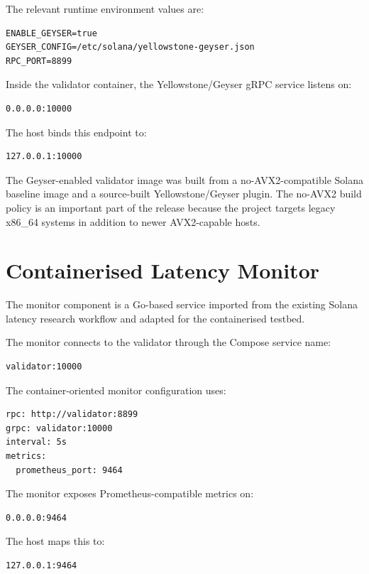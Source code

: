 \documentclass[11pt,a4paper]{article}
\begin{document}
The relevant runtime environment values are:

\begin{lstlisting}
ENABLE_GEYSER=true
GEYSER_CONFIG=/etc/solana/yellowstone-geyser.json
RPC_PORT=8899
\end{lstlisting}

Inside the validator container, the Yellowstone/Geyser gRPC service listens on:

\begin{lstlisting}
0.0.0.0:10000
\end{lstlisting}

The host binds this endpoint to:

\begin{lstlisting}
127.0.0.1:10000
\end{lstlisting}

The Geyser-enabled validator image was built from a no-AVX2-compatible Solana baseline image and a source-built Yellowstone/Geyser plugin. The no-AVX2 build policy is an important part of the release because the project targets legacy x86\_64 systems in addition to newer AVX2-capable hosts.

\section{Containerised Latency Monitor}

The monitor component is a Go-based service imported from the existing Solana latency research workflow and adapted for the containerised testbed.

The monitor connects to the validator through the Compose service name:

\begin{lstlisting}
validator:10000
\end{lstlisting}

The container-oriented monitor configuration uses:

\begin{lstlisting}
rpc: http://validator:8899
grpc: validator:10000
interval: 5s
metrics:
  prometheus_port: 9464
\end{lstlisting}

The monitor exposes Prometheus-compatible metrics on:

\begin{lstlisting}
0.0.0.0:9464
\end{lstlisting}

The host maps this to:

\begin{lstlisting}
127.0.0.1:9464
\end{lstlisting}
\end{document}
